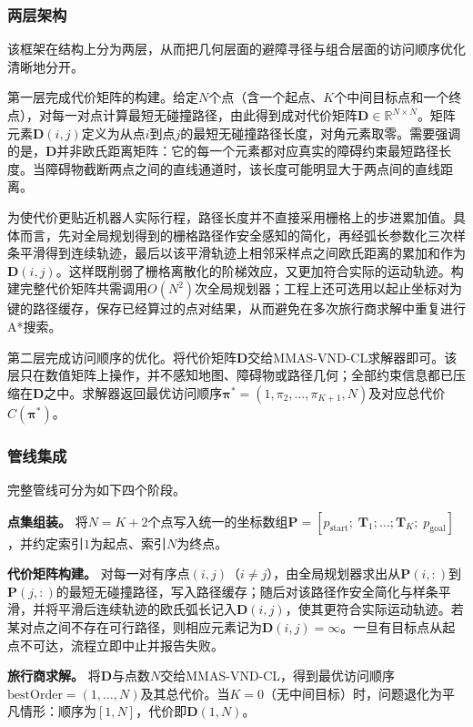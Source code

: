 \documentclass[lettersize,journal]{IEEEtran}
\begin{document}
\subsubsection{两层架构}
该框架在结构上分为两层，从而把几何层面的避障寻径与组合层面的访问顺序优化清晰地分开。

第一层完成代价矩阵的构建。给定$N$个点（含一个起点、$K$个中间目标点和一个终点），对每一对点计算最短无碰撞路径，由此得到成对代价矩阵$\mathbf{D} \in \mathbb{R}^{N \times N}$。矩阵元素$\mathbf{D}(i, j)$定义为从点$i$到点$j$的最短无碰撞路径长度，对角元素取零。需要强调的是，$\mathbf{D}$并非欧氏距离矩阵：它的每一个元素都对应真实的障碍约束最短路径长度。当障碍物截断两点之间的直线通道时，该长度可能明显大于两点间的直线距离。

为使代价更贴近机器人实际行程，路径长度并不直接采用栅格上的步进累加值。具体而言，先对全局规划得到的栅格路径作安全感知的简化，再经弧长参数化三次样条平滑得到连续轨迹，最后以该平滑轨迹上相邻采样点之间欧氏距离的累加和作为$\mathbf{D}(i, j)$。这样既削弱了栅格离散化的阶梯效应，又更加符合实际的运动轨迹。构建完整代价矩阵共需调用$O(N^2)$次全局规划器；工程上还可选用以起止坐标对为键的路径缓存，保存已经算过的点对结果，从而避免在多次旅行商求解中重复进行A*搜索。

第二层完成访问顺序的优化。将代价矩阵$\mathbf{D}$交给MMAS-VND-CL求解器即可。该层只在数值矩阵上操作，并不感知地图、障碍物或路径几何；全部约束信息都已压缩在$\mathbf{D}$之中。求解器返回最优访问顺序$\bm{\pi}^{*} = (1, \pi_2, \dots, \pi_{K+1}, N)$及对应总代价$C(\bm{\pi}^{*})$。
\subsubsection{管线集成}
完整管线可分为如下四个阶段。

\textbf{点集组装。} 将$N = K + 2$个点写入统一的坐标数组$\mathbf{P} = [p_{\mathrm{start}};\; \mathbf{T}_1; \dots; \mathbf{T}_K;\; p_{\mathrm{goal}}]$，并约定索引$1$为起点、索引$N$为终点。

\textbf{代价矩阵构建。} 对每一对有序点$(i, j)$（$i \neq j$），由全局规划器求出从$\mathbf{P}(i,:)$到$\mathbf{P}(j,:)$的最短无碰撞路径，写入路径缓存；随后对该路径作安全简化与样条平滑，并将平滑后连续轨迹的欧氏弧长记入$\mathbf{D}(i, j)$，使其更符合实际运动轨迹。若某对点之间不存在可行路径，则相应元素记为$\mathbf{D}(i, j) = \infty$。一旦有目标点从起点不可达，流程立即中止并报告失败。

\textbf{旅行商求解。} 将$\mathbf{D}$与点数$N$交给MMAS-VND-CL，得到最优访问顺序$\mathrm{bestOrder} = (1, \dots, N)$及其总代价。当$K = 0$（无中间目标）时，问题退化为平凡情形：顺序为$[1, N]$，代价即$\mathbf{D}(1, N)$。
\end{document}
